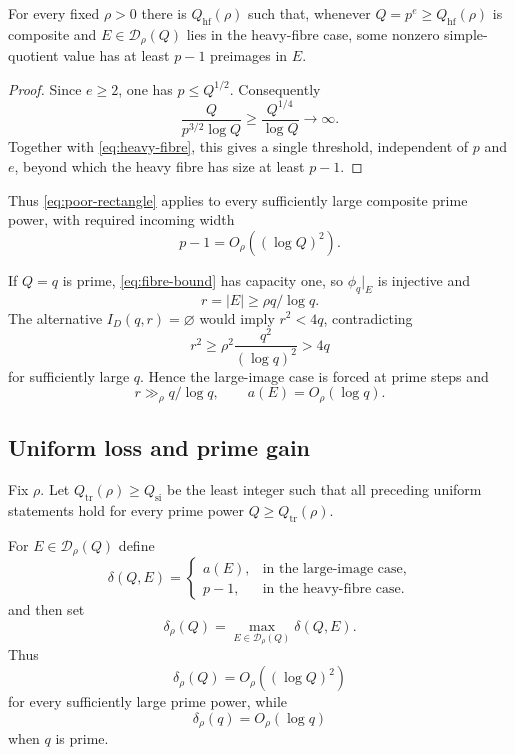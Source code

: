 \begin{lemma}\label{lem:uniform-heavy-fibre}
For every fixed $\rho>0$ there is $Q_{\mathrm{hf}}(\rho)$ such that, whenever $Q=p^e\ge Q_{\mathrm{hf}}(\rho)$ is composite and $E\in\mathcal D_\rho(Q)$ lies in the heavy-fibre case, some nonzero simple-quotient value has at least $p-1$ preimages in $E$.
\end{lemma}

\begin{proof}
Since $e\ge2$, one has $p\le Q^{1/2}$.  Consequently
\[
\frac{Q}{p^{3/2}\log Q}
\ge\frac{Q^{1/4}}{\log Q}
\longrightarrow\infty.
\]
Together with \eqref{eq:heavy-fibre}, this gives a single threshold, independent of $p$ and $e$, beyond which the heavy fibre has size at least $p-1$.
\end{proof}

Thus \eqref{eq:poor-rectangle} applies to every sufficiently large composite prime power, with required incoming width
\[
p-1=O_\rho((\log Q)^2).
\]

If $Q=q$ is prime, \eqref{eq:fibre-bound} has capacity one, so $\phi_q|_E$ is injective and
\[
r=|E|\ge \rho q/\log q.
\]
The alternative $I_D(q,r)=\varnothing$ would imply $r^2<4q$, contradicting
\[
r^2\ge \rho^2\frac{q^2}{(\log q)^2}>4q
\]
for sufficiently large $q$.  Hence the large-image case is forced at prime steps and
\begin{equation}\label{eq:prime-rich}
r\gg_\rho q/\log q,
\qquad
a(E)=O_\rho(\log q).
\end{equation}

\subsection{Uniform loss and prime gain}

Fix $\rho$.  Let $Q_{\mathrm{tr}}(\rho)\ge Q_{\mathrm{si}}$ be the least integer such that all preceding uniform statements hold for every prime power $Q\ge Q_{\mathrm{tr}}(\rho)$.

For $E\in\mathcal D_\rho(Q)$ define
\[
\delta(Q,E)=
\begin{cases}
a(E),&\text{in the large-image case},\\
p-1,&\text{in the heavy-fibre case}.
\end{cases}
\]
and then set
\begin{equation}\label{eq:common-demand}
\delta_\rho(Q)=
\max_{E\in\mathcal D_\rho(Q)}\delta(Q,E).
\end{equation}
Thus
\begin{equation}\label{eq:d-composite}
\delta_\rho(Q)=O_\rho((\log Q)^2)
\end{equation}
for every sufficiently large prime power, while
\begin{equation}\label{eq:d-prime}
\delta_\rho(q)=O_\rho(\log q)
\end{equation}
when $q$ is prime.

